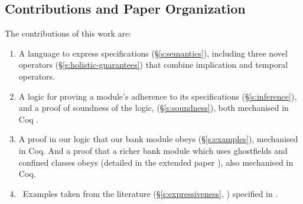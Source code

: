  
 
  
\subsection{Contributions and Paper Organization}


%
The contributions of this {work} are:
\begin{enumerate}
\item   A language to express \Nec specifications (\S\ref{s:semantics}), including three novel \Nec operators (\S\ref{s:holistic-guarantees}) that combine implication and temporal operators.  

 \item
A logic for proving a module's adherence to its
 \Nec specifications (\S\ref{s:inference}), and a proof of soundness of the logic, (\S\ref{s:soundness}),
both mechanised in Coq . 
 \item
A proof in our logic %
  that our bank module {obeys} %
  \SrobustB (\S\ref{s:examples}),     mechanised in Coq.
  And a proof that
  a richer bank module which uses ghostfields and confined classes  obeys  \SrobustB 
  (detailed in the extended paper %
  ),
  also mechanised in Coq.
\item \ {Examples taken from the literature  (\S\ref{s:expressiveness}, 
	) specified in \Nec .}

\end{enumerate}




